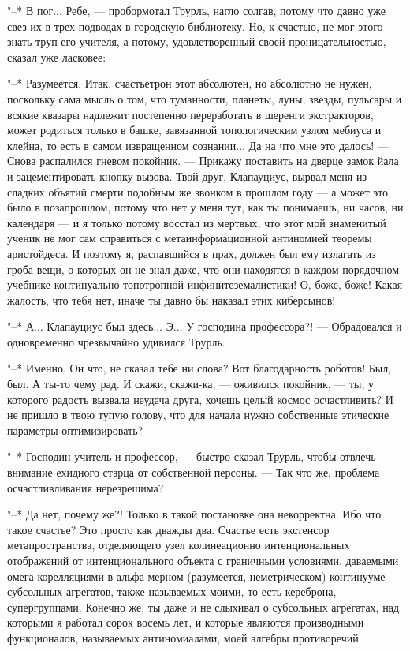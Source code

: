 "--* В пог... Ребе, --- пробормотал Трурль, нагло солгав,
потому что давно уже свез их в трех подводах в городскую
библиотеку. Но, к счастью, не мог этого знать труп его
учителя, а потому, удовлетворенный своей проницательностью,
сказал уже ласковее:

"--* Разумеется. Итак, счастьетрон этот абсолютен, но
абсолютно не нужен, поскольку сама мысль о том, что
туманности, планеты, луны, звезды, пульсары и всякие квазары
надлежит постепенно переработать в шеренги экстракторов,
может родиться только в башке, завязанной топологическим
узлом мебиуса и клейна, то есть в самом извращенном
сознании... Да на что мне это далось! --- Снова распалился
гневом покойник. --- Прикажу поставить на дверце замок йала и
зацементировать кнопку вызова. Твой друг, Клапауциус, вырвал
меня из сладких объятий смерти подобным же звонком в прошлом
году --- а может это было в позапрошлом, потому что нет у меня
тут, как ты понимаешь, ни часов, ни календаря --- и я только
потому восстал из мертвых, что этот мой знаменитый ученик не
мог сам справиться с метаинформационной антиномией теоремы
аристойдеса. И поэтому я, распавшийся в прах, должен был ему
излагать из гроба вещи, о которых он не знал даже, что они
находятся в каждом порядочном учебнике
континуально-топотропной инфинитеземалистики! О, боже, боже!
Какая жалость, что тебя нет, иначе ты давно бы наказал этих
киберсынов!

"--* А... Клапауциус был здесь... Э... У господина
профессора?! --- Обрадовался и одновременно чрезвычайно
удивился Трурль.

"--* Именно. Он что, не сказал тебе ни слова? Вот
благодарность роботов! Был, был. А ты-то чему рад. И скажи,
скажи-ка, --- оживился покойник, --- ты, у которого радость
вызвала неудача друга, хочешь целый космос осчастливить? И
не пришло в твою тупую голову, что для начала нужно
собственные этические параметры оптимизировать?

"--* Господин учитель и профессор, --- быстро сказал Трурль,
чтобы отвлечь внимание ехидного старца от собственной
персоны. --- Так что же, проблема осчастливливания
нерезрешима?

"--* Да нет, почему же?! Только в такой постановке она
некорректна. Ибо что такое счастье? Это просто как дважды
два. Счастье есть экстенсор метапространства, отделяющего
узел колинеационно интенциональных отображений от
интенционального объекта с граничными условиями, даваемыми
омега-корелляциями в альфа-мерном (разумеется,
неметрическом) континууме субсольных агрегатов, также
называемых моими, то есть кереброна, супергруппами. Конечно
же, ты даже и не слыхивал о субсольных агрегатах, над
которыми я работал сорок восемь лет, и которые являются
производными функционалов, называемых антиномиалами, моей
алгебры противоречий.

